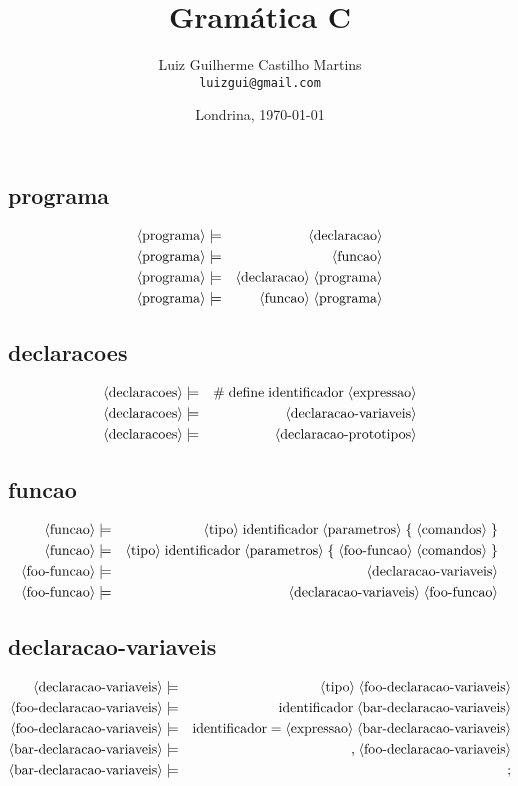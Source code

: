 \documentclass[12pt,a4papper]{article}
\title{Gramática C}
\author{Luiz Guilherme Castilho Martins \\
\texttt{luizgui@gmail.com}}
\date{Londrina, \today}
\newcommand{\pn}[1]{\langle \textnormal{#1} \rangle}
\newcommand{\pp}{\models}
\newcommand{\ww}{\;}
\newcommand{\sm}[1]{\textnormal{#1}}
\begin{document}
\begin{landscape}

\subsection{programa}
\begin{eqnarray}
\pn{programa} &\pp& \pn{declaracao} \\
\pn{programa} &\pp& \pn{funcao} \\
\pn{programa} &\pp& \pn{declaracao} \ww \pn{programa} \\
\pn{programa} &\pp& \pn{funcao} \ww \pn{programa} 
\end{eqnarray}


\subsection{declaracoes}
\begin{eqnarray}
\pn{declaracoes} &\pp& \sm{\#} \ww \sm{define} \ww \sm{identificador} \ww \pn{expressao} \\
\pn{declaracoes} &\pp& \pn{declaracao-variaveis} \\
\pn{declaracoes} &\pp& \pn{declaracao-prototipos}
\end{eqnarray}



\subsection{funcao}
\begin{eqnarray}
        \pn{funcao} &\pp& \pn{tipo} \ww \sm{identificador} \ww \pn{parametros} \ww \sm{\{} \ww \pn{comandos} \ww \sm{\}} \\
        \pn{funcao} &\pp& \pn{tipo} \ww \sm{identificador} \ww \pn{parametros} \ww \sm{\{} \ww  \pn{foo-funcao} \ww \pn{comandos} \ww \sm{\}} \\
    \pn{foo-funcao} &\pp& \pn{declaracao-variaveis} \\
    \pn{foo-funcao} &\pp& \pn{declaracao-variaveis} \ww \pn{foo-funcao}
\end{eqnarray}


\subsection{declaracao-variaveis}
\begin{eqnarray}
\pn{declaracao-variaveis} &\pp& \pn{tipo} \ww \pn{foo-declaracao-variaveis}  \\
\pn{foo-declaracao-variaveis} &\pp& \sm{identificador} \ww \pn{bar-declaracao-variaveis} \\
\pn{foo-declaracao-variaveis} &\pp& \sm{identificador} \ww \sm{$=$} \ww \pn{expressao} \ww \pn{bar-declaracao-variaveis} \\
\pn{bar-declaracao-variaveis} &\pp& \sm{,} \ww \pn{foo-declaracao-variaveis} \\
\pn{bar-declaracao-variaveis} &\pp& \sm{;}
\end{eqnarray}



\end{landscape}
\end{document}
